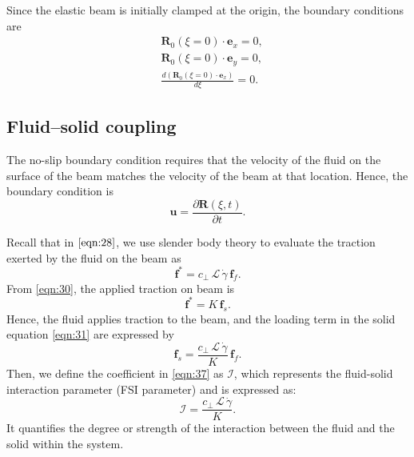 \documentclass[a4paper,12pt]{report}
\begin{document}
Since the elastic beam is initially clamped at the origin, the boundary conditions are
\begin{equation}
	\label{eqn:58}
	\begin{aligned}
	&\mathbf{R}_0(\xi=0)\cdot\mathbf{e}_x=0,\\
	&\mathbf{R}_0(\xi=0)\cdot\mathbf{e}_y=0,\\
	&\frac{d\left(\mathbf{R}_0(\xi=0)\cdot\mathbf{e}_x\right)}{d\xi}=0.
	\end{aligned}
\end{equation}

\subsection{Fluid–solid coupling}
The no-slip boundary condition requires that the velocity of the fluid on the surface of the beam matches the velocity of the beam at that location. Hence, the boundary condition is 
\begin{equation}
	\label{eqn:100}
	\mathbf{u}=\frac{\partial \mathbf{R}(\xi,t)}{\partial t}.
\end{equation}

Recall that in $\eqref{eqn:28}$, we use slender body theory to evaluate the traction exerted by the fluid on the beam as
\begin{equation}
	\label{eqn:102}
	\mathbf{f}^*=c_\perp\,\mathcal{L}\,\dot{\gamma}\,\mathbf{f}_{f}.
\end{equation}
From \eqref{eqn:30}, the applied traction on beam is 
\begin{equation}
	\label{eqn:103}
	\mathbf{f}^*=K\,\mathbf{f}_{s}.
\end{equation}
Hence, the fluid applies traction to the beam, and the loading term in the solid equation \eqref{eqn:31} are expressed by
\begin{equation}
	\label{eqn:37}
	\textbf{f}_{s}=\frac{c_\perp\,\mathcal{L}\,\dot{\gamma}}{K}\,\textbf{f}_{f}.
\end{equation}
Then, we define the coefficient in \eqref{eqn:37} as $\mathcal{I}$, which represents the fluid-solid interaction parameter (FSI parameter) and is expressed as:
\begin{equation}
	\label{eqn:38}
	\mathcal{I}=\frac{c_\perp\,\mathcal{L}\,\dot{\gamma}}{K}.
\end{equation}
It quantifies the degree or strength of the interaction between the fluid and the solid within the system.
\end{document}
